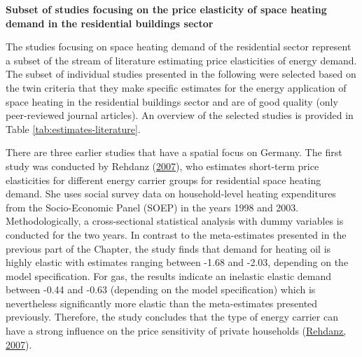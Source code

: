 \documentclass[12pt,twoside]{reedthesis}
\begin{document}
\textbf{Subset of studies focusing on the price elasticity of space heating demand in the residential buildings sector}

The studies focusing on space heating demand of the residential sector represent a subset of the stream of literature estimating price elasticities of energy demand. The subset of individual studies presented in the following were selected based on the twin criteria that they make specific estimates for the energy application of space heating in the residential buildings sector and are of good quality (only peer-reviewed journal articles). An overview of the selected studies is provided in Table \ref{tab:estimates-literature}.

There are three earlier studies that have a spatial focus on Germany. The first study was conducted by Rehdanz (\protect\hyperlink{ref-rehdanz07}{2007}), who estimates short-term price elasticities for different energy carrier groups for residential space heating demand. She uses social survey data on household-level heating expenditures from the Socio-Economic Panel (SOEP) in the years 1998 and 2003. Methodologically, a cross-sectional statistical analysis with dummy variables is conducted for the two years. In contrast to the meta-estimates presented in the previous part of the Chapter, the study finds that demand for heating oil is highly elastic with estimates ranging between -1.68 and -2.03, depending on the model specification. For gas, the results indicate an inelastic elastic demand between -0.44 and -0.63 (depending on the model specification) which is nevertheless significantly more elastic than the meta-estimates presented previously. Therefore, the study concludes that the type of energy carrier can have a strong influence on the price sensitivity of private households (\protect\hyperlink{ref-rehdanz07}{Rehdanz, 2007}).
\end{document}

